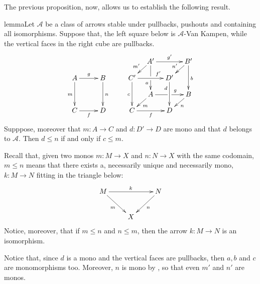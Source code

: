 \documentclass[a4paper,UKenglish,cleveref,pdftex, thm-restate,numberwithinsect]{lipics}
\def\C{\textbf {\textup{C}}}
\begin{document}
The previous proposition, now, allows us to establish the following result.
\begin{theoremEnd}[category=sec2]{lemma}\label{lem:varie}Let $\mathcal{A}$ be a class of arrows stable under pullbacks, pushouts and containing all isomorphisms.  Suppose that, the left square below is $\mathcal{A}$-Van Kampen, while the vertical faces in the right cube are pullbacks.
		\[\xymatrix@C=10pt@R=10pt{&&&&&A'\ar[dd]|\hole_(.65){a}\ar[rr]^{g'} \ar[dl]_{m'} && B' \ar[dd]^{b} \ar[dl]_{n'} \\ A \ar[dd]_{m}\ar[rr]^{g}&&B\ar[dd]^{n}&&C'  \ar[dd]_{c}\ar[rr]^(.7){f'} & & D' \ar[dd]_(.3){d}\\&&&&&A\ar[rr]|\hole^(.65){g} \ar[dl]^{m} && B \ar[dl]^{n} \\C\ar[rr]_{f} &&D&&C \ar[rr]_{f} & & D}\]
Supppose, moreover that $m\colon A\to C$ and $d\colon D'\to D$ are mono and that $d$ belongs to $\mathcal{A}$. Then $d\leq n$ if and only if $c \leq m$.
\end{theoremEnd}


\begin{remark}
	Recall that, given two monos $m:M\to X$ and $n:N\to X$ with the same codomain, $m\leq n$ means that there exists a, necessarily unique and necessarily mono, $k:M\to N$ fitting in the triangle below:
	\[\xymatrix{M\ar[rr]^{k}  \ar[dr]_{m}&& N \ar[dl]^{n}\\ & X}\]
	Notice, moreover, that  if $m\leq n$ and $n\leq m$, then the arrow $k:M\to N$ is an isomorphism.  
\end{remark}

\begin{remark}
	Notice that, since $d$ is a mono and the vertical faces are pullbacks, then $a, b$ and $c$ are monomorphisms too. Moreover, $n$ is mono by , so that even $m'$ and $n'$ are monos.
\end{remark}
\end{document}

